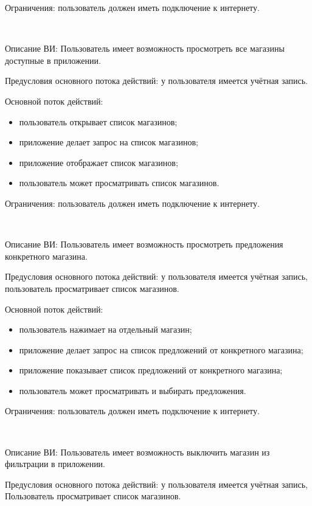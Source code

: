 Ограничения: пользователь должен иметь подключение к интернету.
 
~\par
\label{use:showstores}
Описание ВИ: Пользователь имеет возможность просмотреть все магазины доступные в приложении.
 
Предусловия основного потока действий: у пользователя имеется учётная запись.
 
Основной поток действий:
\begin{itemize}
   \item пользователь открывает список магазинов;
   \item приложение делает запрос на список магазинов;
   \item приложение отображает список магазинов;
   \item пользователь может просматривать список магазинов.
\end{itemize}
 
Ограничения: пользователь должен иметь подключение к интернету.

~\par
\label{use:singlestore}
Описание ВИ: Пользователь имеет возможность просмотреть предложения конкретного магазина.
 
Предусловия основного потока действий: у пользователя имеется учётная запись, пользователь просматривает список магазинов.
 
Основной поток действий:
\begin{itemize}
   \item пользователь нажимает на отдельный магазин;
   \item приложение делает запрос на список предложений от конкретного магазина;
   \item приложение показывает список предложений от конкретного магазина;
   \item пользователь может просматривать и выбирать предложения.
\end{itemize}
 
Ограничения: пользователь должен иметь подключение к интернету.

~\par
Описание ВИ: Пользователь имеет возможность выключить магазин из фильтрации в приложении.
 
Предусловия основного потока действий: у пользователя имеется учётная запись, Пользователь просматривает список магазинов.
 
